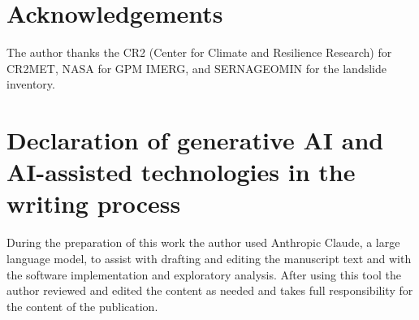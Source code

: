 \documentclass[authoryear,preprint,review,12pt]{elsarticle}
\begin{document}
\section*{Acknowledgements}

The author thanks the CR2 (Center for Climate and
Resilience Research) for CR2MET, NASA for GPM IMERG, and SERNAGEOMIN for the
landslide inventory.

\section*{Declaration of generative AI and AI-assisted technologies in the writing process}

During the preparation of this work the author used Anthropic Claude, a large
language model, to assist with drafting and editing the manuscript text and with
the software implementation and exploratory analysis. After using this tool the
author reviewed and edited the content as needed and takes full responsibility for
the content of the publication.
\end{document}
